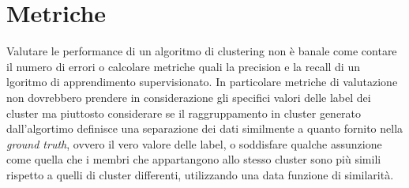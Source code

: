 \section{Metriche}
Valutare le performance di un algoritmo di clustering non è banale come contare il numero di errori o calcolare metriche quali la precision e la recall di un lgoritmo di apprendimento supervisionato. In particolare metriche di valutazione non dovrebbero prendere in considerazione gli specifici valori delle label dei cluster ma piuttosto considerare se il raggruppamento in cluster generato dall'algortimo definisce una separazione dei dati similmente a quanto fornito nella \textit{ground truth}, ovvero il vero valore delle label, o soddisfare qualche assunzione come quella che i membri che appartangono allo stesso cluster sono più simili rispetto a quelli di cluster differenti, utilizzando una data funzione di similarità.

